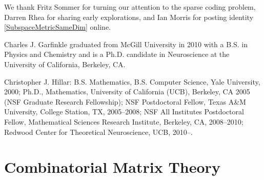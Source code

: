 \documentclass[journal, twocolumn]{IEEEtran}
\begin{document}
We thank Fritz Sommer for turning our attention to the sparse coding problem, Darren Rhea for sharing early explorations, and Ian Morris for posting identity \eqref{SubspaceMetricSameDim} online.







\vspace{-.8 cm}
\begin{IEEEbiographynophoto}{Charles J. Garfinkle}
graduated from McGill University in 2010 with a B.S. in Physics and Chemistry and is a Ph.D. candidate in Neuroscience at the University of California, Berkeley, CA.
\end{IEEEbiographynophoto}
\vspace{-1.1 cm} 
\begin{IEEEbiographynophoto}{Christopher J. Hillar:} B.S. Mathematics, B.S. Computer Science, Yale University, 2000; Ph.D., Mathematics, University of California (UCB), Berkeley, CA 2005 (NSF Graduate Research Fellowship); NSF Postdoctoral Fellow, Texas A\&M University, College Station, TX, 2005--2008; NSF All Institutes Postdoctoral Fellow, Mathematical Sciences Research Institute, Berkeley, CA, 2008--2010; Redwood Center for Theoretical Neuroscience, UCB, 2010--.  %
\end{IEEEbiographynophoto}


 \clearpage

\appendices
\section{Combinatorial Matrix Theory}\label{appendixA}
\end{document}
